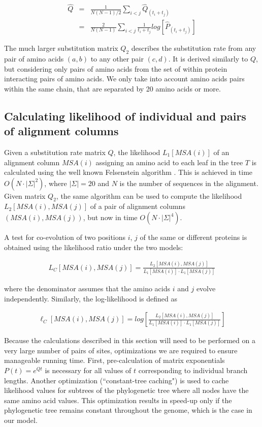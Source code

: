 \begin{eqnarray*}
	\hat{Q} & = & \frac{1}{N(N-1)/2} \sum_{i < j} \hat{Q}_(t_i+t_j) \\
	            & =  & \frac{2}{N(N-1)} \sum_{i<j} \frac{1}{t_i+t_j} log[ \hat{P}_(t_i+t_j) ]
\end{eqnarray*}

The much larger substitution matrix $Q_2$ describes the substitution rate from any pair of amino acids $(a,b)$ to any other pair $(c,d)$. It is derived similarly to $Q$, but considering only pairs of amino acids from the set of within protein interacting pairs of amino acids. We only take into account amino acids pairs within the same chain, that are separated by 20 amino acids or more. 

\subsection{Calculating likelihood of individual and pairs of alignment columns}

Given a substitution rate matrix $Q$, the likelihood $L_1[MSA(i)]$ of an alignment column $MSA(i)$ assigning an amino acid to each leaf in the tree $T$ is calculated using the well known Felsenstein algorithm \cite{felsenstein2004inferring}. This is achieved in time $O(N \cdot |\Sigma|^2)$, where $|\Sigma|=20$ and $N$ is the number of sequences in the alignment. Given matrix $Q_2$, the same algorithm can be used to compute the likelihood $L_2[ MSA(i), MSA(j) ]$ of a pair of alignment columns $( MSA(i), MSA(j) )$, but now in time $O(N \cdot |\Sigma|^4)$. 

A test for co-evolution of two positions $i$, $j$ of the same or different proteins is obtained using the likelihood ratio under the two models: 

\begin{eqnarray*}
	L_C[MSA(i), MSA(j)] = \frac{L_2[ MSA(i), MSA(j) ]}{L_1[MSA(i)] \cdot L_1[MSA(j)]}
\end{eqnarray*}

\noindent where the denominator assumes that the amino acids $i$ and $j$ evolve independently. Similarly, the log-likelihood is defined as

\begin{eqnarray}
    \ell_C[MSA(i), MSA(j)] = log \left[ \frac{L_2[ MSA(i), MSA(j) ]}{L_1[MSA(i)] \cdot L_1[MSA(j)]} \right]
\end{eqnarray}

Because the calculations described in this section will need to be performed on a very large number of pairs of sites, optimizations we are required to ensure manageable running time. First, pre-calculation of  matrix exponentials $P(t) = e^{Qt}$ is necessary for all values of $t$ corresponding to individual branch lengths. Another optimization (``constant-tree caching") is used to cache likelihood values for subtrees of the phylogenetic tree where all nodes have the same amino acid values. This optimization results in speed-up only if the phylogenetic tree remains constant throughout the genome, which is the case in our model.

